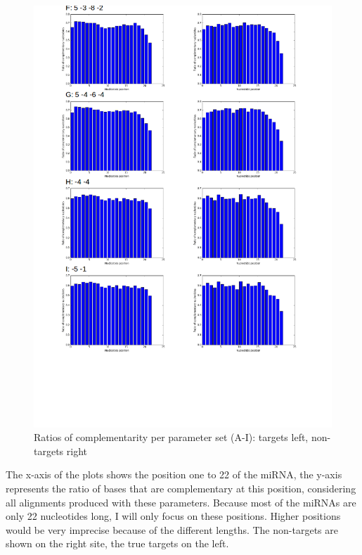 \documentclass[12pt]{article}
\begin{document}
\begin{figure}
\includegraphics[scale=0.65]{results/compl2.png}
\vspace{-3cm}
\caption{Ratios of complementarity per parameter set (A-I): targets left, non-targets right}
\label{ratios}
\end{figure}

The x-axis of the plots shows the position one to 22 of the miRNA, the y-axis represents the ratio of bases that are complementary at this position, considering all alignments produced with these parameters. Because most of the miRNAs are only 22 nucleotides long, I will only focus on these positions. Higher positions would be very imprecise because of the different lengths. The non-targets are shown on the right site, the true targets on the left.
\end{document}
